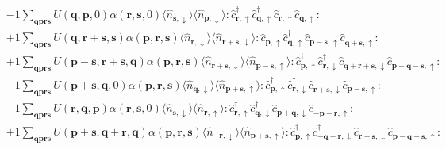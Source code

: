 \begin{align*}
	&-1 \sum_{ \mathbf{q} \mathbf{p} \mathbf{r} \mathbf{s} } U( \mathbf{q}, \mathbf{p}, 0 )  \alpha( \mathbf{r}, \mathbf{s}, 0 )   \langle \hat{n}_{ \mathbf{s}, \downarrow } \rangle \langle \hat{n}_{ \mathbf{p}, \downarrow } \rangle :\hat{c}_{ \mathbf{r}, \uparrow }^\dagger \hat{c}_{ \mathbf{q}, \uparrow }^\dagger \hat{c}_{ \mathbf{r}, \uparrow }^{\phantom{\dagger}}\hat{c}_{ \mathbf{q}, \uparrow }^{\phantom{\dagger}}: \\
	&+1 \sum_{ \mathbf{q} \mathbf{p} \mathbf{r} \mathbf{s} } U( \mathbf{q}, \mathbf{r}+\mathbf{s}, \mathbf{s} )  \alpha( \mathbf{p}, \mathbf{r}, \mathbf{s} )   \langle \hat{n}_{ \mathbf{r}, \downarrow } \rangle \langle \hat{n}_{ \mathbf{r}+\mathbf{s}, \downarrow } \rangle :\hat{c}_{ \mathbf{p}, \uparrow }^\dagger \hat{c}_{ \mathbf{q}, \uparrow }^\dagger \hat{c}_{ \mathbf{p}-\mathbf{s}, \uparrow }^{\phantom{\dagger}}\hat{c}_{ \mathbf{q}+\mathbf{s}, \uparrow }^{\phantom{\dagger}}: \\
	&+1 \sum_{ \mathbf{q} \mathbf{p} \mathbf{r} \mathbf{s} } U( \mathbf{p}-\mathbf{s}, \mathbf{r}+\mathbf{s}, \mathbf{q} )  \alpha( \mathbf{p}, \mathbf{r}, \mathbf{s} )   \langle \hat{n}_{ \mathbf{r}+\mathbf{s}, \downarrow } \rangle \langle \hat{n}_{ \mathbf{p}-\mathbf{s}, \uparrow } \rangle :\hat{c}_{ \mathbf{p}, \uparrow }^\dagger \hat{c}_{ \mathbf{r}, \downarrow }^\dagger \hat{c}_{ \mathbf{q}+\mathbf{r}+\mathbf{s}, \downarrow }^{\phantom{\dagger}}\hat{c}_{ \mathbf{p}-\mathbf{q}-\mathbf{s}, \uparrow }^{\phantom{\dagger}}: \\
	&-1 \sum_{ \mathbf{q} \mathbf{p} \mathbf{r} \mathbf{s} } U( \mathbf{p}+\mathbf{s}, \mathbf{q}, 0 )  \alpha( \mathbf{p}, \mathbf{r}, \mathbf{s} )   \langle \hat{n}_{ \mathbf{q}, \downarrow } \rangle \langle \hat{n}_{ \mathbf{p}+\mathbf{s}, \uparrow } \rangle :\hat{c}_{ \mathbf{p}, \uparrow }^\dagger \hat{c}_{ \mathbf{r}, \downarrow }^\dagger \hat{c}_{ \mathbf{r}+\mathbf{s}, \downarrow }^{\phantom{\dagger}}\hat{c}_{ \mathbf{p}-\mathbf{s}, \uparrow }^{\phantom{\dagger}}: \\
	&-1 \sum_{ \mathbf{q} \mathbf{p} \mathbf{r} \mathbf{s} } U( \mathbf{r}, \mathbf{q}, \mathbf{p} )  \alpha( \mathbf{r}, \mathbf{s}, 0 )   \langle \hat{n}_{ \mathbf{s}, \downarrow } \rangle \langle \hat{n}_{ \mathbf{r}, \uparrow } \rangle :\hat{c}_{ \mathbf{r}, \uparrow }^\dagger \hat{c}_{ \mathbf{q}, \downarrow }^\dagger \hat{c}_{ \mathbf{p}+\mathbf{q}, \downarrow }^{\phantom{\dagger}}\hat{c}_{ -\mathbf{p}+\mathbf{r}, \uparrow }^{\phantom{\dagger}}: \\
	&+1 \sum_{ \mathbf{q} \mathbf{p} \mathbf{r} \mathbf{s} } U( \mathbf{p}+\mathbf{s}, \mathbf{q}+\mathbf{r}, \mathbf{q} )  \alpha( \mathbf{p}, \mathbf{r}, \mathbf{s} )   \langle \hat{n}_{ -\mathbf{r}, \downarrow } \rangle \langle \hat{n}_{ \mathbf{p}+\mathbf{s}, \uparrow } \rangle :\hat{c}_{ \mathbf{p}, \uparrow }^\dagger \hat{c}_{ -\mathbf{q}+\mathbf{r}, \downarrow }^\dagger \hat{c}_{ \mathbf{r}+\mathbf{s}, \downarrow }^{\phantom{\dagger}}\hat{c}_{ \mathbf{p}-\mathbf{q}-\mathbf{s}, \uparrow }^{\phantom{\dagger}}: \\

\end{align*}
